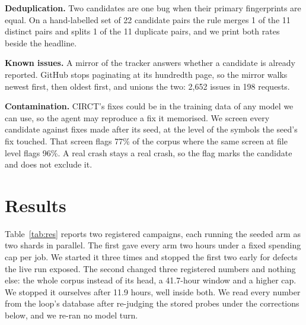 \documentclass[conference]{IEEEtran}
\begin{document}
\textbf{Deduplication.} Two candidates are one bug when their primary
fingerprints are equal. On a hand-labelled set of 22 candidate pairs the rule
merges 1 of the 11 distinct pairs and splits 1 of the 11 duplicate pairs, and
we print both rates beside the headline. %

\textbf{Known issues.} A mirror of the tracker answers whether a candidate is
already reported. GitHub stops paginating at its hundredth page, so the mirror
walks newest first, then oldest first, and unions the two: 2,652 issues in 198
requests. %

\textbf{Contamination.} CIRCT's fixes could be in the training data of any model
we can use, so the agent may reproduce a fix it memorised. We screen every
candidate against fixes made after its seed, at the level of the symbols the
seed's fix touched. That screen flags 77\% of the corpus where the same screen
at file level flags 96\%. %
A real crash stays a real crash, so the flag marks the candidate and does not
exclude it.

\section{Results}\label{sec:res}
Table~\ref{tab:res} reports two registered campaigns, each running the seeded
arm as two shards in parallel. The first gave every arm two hours under a fixed
spending cap per job. We started it three times and stopped the first two early
for defects the live run exposed. %
The second changed three registered numbers and nothing else: the whole corpus
instead of its head, a 41.7-hour window and a higher cap. We stopped it
ourselves after 11.9 hours, well inside both. %
We read every number from the loop's database after re-judging the stored
probes under the corrections below, and we re-ran no model turn. %
\end{document}
